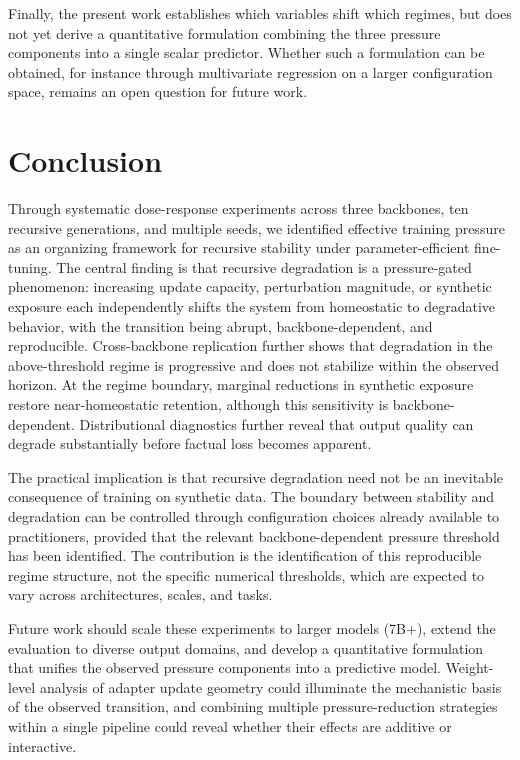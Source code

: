\documentclass[a4paper,fleqn]{cas-dc}
\begin{document}
Finally, the present work establishes which variables shift which regimes,
but does not yet derive a quantitative formulation combining the three pressure
components into a single scalar predictor. Whether such a formulation can be
obtained, for instance through multivariate regression on a larger configuration
space, remains an open question for future work.

\section{Conclusion}\label{sec:conclusion}

Through systematic dose-response experiments across three backbones, ten
recursive generations, and multiple seeds, we identified effective training
pressure as an organizing framework for recursive stability under
parameter-efficient fine-tuning. The central finding is that recursive
degradation is a pressure-gated phenomenon: increasing update capacity,
perturbation magnitude, or synthetic exposure each independently shifts the
system from homeostatic to degradative behavior, with the transition being
abrupt, backbone-dependent, and reproducible. Cross-backbone replication further
shows that degradation in the above-threshold regime is progressive and does not
stabilize within the observed horizon. At the regime boundary, marginal
reductions in synthetic exposure restore near-homeostatic retention, although
this sensitivity is backbone-dependent. Distributional diagnostics further reveal
that output quality can degrade substantially before factual loss becomes
apparent.

The practical implication is that recursive degradation need not be an
inevitable consequence of training on synthetic data. The boundary between
stability and degradation can be controlled through configuration choices
already available to practitioners, provided that the relevant
backbone-dependent pressure threshold has been identified. The contribution is
the identification of this reproducible regime structure, not the specific
numerical thresholds, which are expected to vary across architectures, scales,
and tasks.

Future work should scale these experiments to larger models (7B+), extend the
evaluation to diverse output domains, and develop a quantitative formulation
that unifies the observed pressure components into a predictive model.
Weight-level analysis of adapter update geometry could illuminate the
mechanistic basis of the observed transition, and combining multiple
pressure-reduction strategies within a single pipeline could reveal whether
their effects are additive or interactive.
\end{document}
